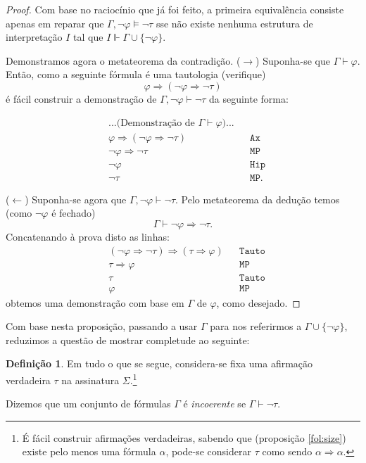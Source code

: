\documentclass{report}
\theoremstyle{definition}
\newtheorem{definicao}{Definição}
\theoremstyle{remark}
\newcommand{\imply}{\mathbin{\Rightarrow}}
\begin{document}
	\begin{proof}
	Com base no raciocínio que já foi feito, a primeira equivalência consiste apenas em reparar que $\Gamma, \neg \varphi \vDash \neg \tau$ sse não existe nenhuma estrutura de interpretação $I$ tal que $I \Vdash \Gamma \cup \{\neg \varphi\}$.
	
	Demonstramos agora o metateorema da contradição. ($\rightarrow$) Suponha-se que $\Gamma \vdash \varphi$. Então, como a seguinte fórmula é uma tautologia (verifique)
	\[\varphi \imply (\neg \varphi \imply \neg \tau)\]
	é fácil construir a demonstração de $\Gamma, \neg \varphi \vdash \neg \tau$ da seguinte forma:
	
	\begin{align*}
	&\text{...(Demonstração de $\Gamma \vdash \varphi$)...}\\
	&\varphi \imply (\neg \varphi \imply \neg \tau)&&\texttt{Ax}\\
	&\neg \varphi \imply \neg \tau&&\texttt{MP}\\
	&\neg \varphi&&\texttt{Hip}\\
	&\neg \tau&&\texttt{MP}.
	\end{align*}
	
	($\leftarrow$) Suponha-se agora que $\Gamma, \neg \varphi \vdash \neg \tau$. Pelo metateorema da dedução temos (como $\neg \varphi$ é fechado)
	\[\Gamma \vdash \neg \varphi \imply \neg \tau.\]
	Concatenando à prova disto as linhas:
	\begin{align*}
	&(\neg \varphi \imply \neg \tau) \imply (\tau \imply \varphi)&&\texttt{Tauto}\\
	&\tau \imply \varphi&&\texttt{MP}\\
	&\tau&&\texttt{Tauto}\\
	&\varphi&&\texttt{MP}
	\end{align*}
	obtemos uma demonstração com base em $\Gamma$ de $\varphi$, como desejado.
	\end{proof}
	
	Com base nesta proposição, passando a usar $\Gamma$ para nos referirmos a $\Gamma \cup \{\neg \varphi\}$, reduzimos a questão de mostrar completude ao seguinte:
	
	\begin{definicao}
	Em tudo o que se segue, considera-se fixa uma afirmação verdadeira $\tau$ na assinatura $\Sigma$.\footnote{É fácil construir afirmações verdadeiras, sabendo que (proposição \ref{fol:size}) existe pelo menos uma fórmula $\alpha$, pode-se considerar $\tau$ como sendo $\alpha \imply \alpha$.}
	
	Dizemos que um conjunto de fórmulas $\Gamma$ é \emph{incoerente} se $\Gamma \vdash \neg \tau$.
	\end{definicao}
	
\end{document}
